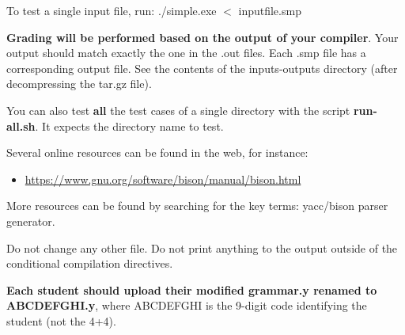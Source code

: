 \documentclass[letter,10pt]{article}
\begin{document}
To test a single input file, run: ./simple.exe $<$ inputfile.smp

{\bf Grading will be performed based on the output of your compiler}. Your output should match
exactly the one in the .out files. Each .smp file has a corresponding output file. See the contents
of the inputs-outputs directory (after decompressing the tar.gz file).

You can also test {\bf all} the test cases of a single directory with the script {\bf run-all.sh}.
It expects the directory name to test.

Several online resources can be found in the web, for instance:
\begin{itemize}
\item
\url{https://www.gnu.org/software/bison/manual/bison.html}
\end{itemize}

More resources can be found by searching for the key terms: yacc/bison parser generator.

Do not change any other file. Do not print anything to the output outside of the conditional compilation directives.

{\bf Each student should  upload their modified grammar.y renamed to ABCDEFGHI.y}, where ABCDEFGHI 
is the 9-digit code identifying the student (not the 4+4).
\end{document}
